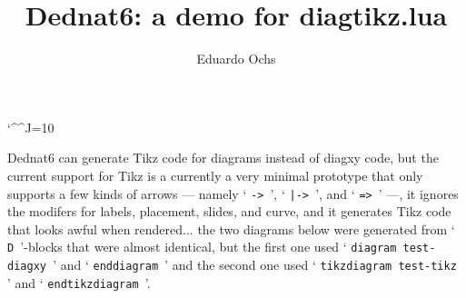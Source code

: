 \documentclass[oneside]{article}
\begin{document}
  \catcode`\^^J=10                      %

\def\defdiagtikz#1#2{\expandafter\def\csname diagtikz-#1\endcsname{#2}}
\def\ifdiagtikzundefined#1{\expandafter\ifx\csname diagtikz-#1\endcsname\relax}
\def\diagtikz#1{\ifdiagtikzundefined{#1}
    \errmessage{UNDEFINED DIAGTIKZ: #1}
  \else
    \csname diagtikz-#1\endcsname
  \fi
}

\def\co#1{{%
  \def\\{\char92}%
  \def\%{\char37}%
  \tt#1%
  }}
\def\qco#1{`\co{#1}'}








\title{Dednat6: a demo for diagtikz.lua}
\author{Eduardo Ochs}
\date{}
\maketitle

Dednat6 can generate Tikz code for diagrams instead of diagxy code,
but the current support for Tikz is a currently a very minimal
prototype that only supports a few kinds of arrows --- namely
\qco{->}, \qco{|->}, and \qco{=>} ---, it ignores the modifers for
labels, placement, slides, and curve, and it generates Tikz code that
looks awful when rendered... the two diagrams below were generated
from \qco{\%D}-blocks that were almost identical, but the first one
used \qco{diagram test-diagxy} and \qco{enddiagram} and the second one
used \qco{tikzdiagram test-tikz} and \qco{endtikzdiagram}.

%

\pu

%
\end{document}
